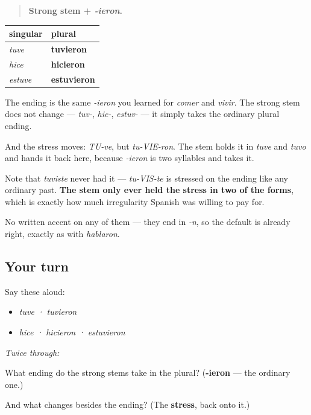 \begin{grammarlens}[title={Grammar Lens: the stem gives the stress back}]
\begin{quote}
\textbf{Strong stem + \emph{-ieron}.}
\end{quote}

\noindent
\begin{tabularx}{\linewidth}{@{}>{\raggedright\arraybackslash}X>{\raggedright\arraybackslash}X@{}}
\toprule
\textbf{singular} & \textbf{plural} \\
\midrule
\emph{tuve} & \textbf{tuvieron} \\
\emph{hice} & \textbf{hicieron} \\
\emph{estuve} & \textbf{estuvieron} \\
\bottomrule
\end{tabularx}

The ending is the same \emph{-ieron} you learned for \emph{comer} and \emph{vivir}. The strong stem does not change — \emph{tuv-}, \emph{hic-}, \emph{estuv-} — it simply takes the ordinary plural ending.

And the stress moves: \emph{TU-ve}, but \emph{tu-VIE-ron}. The stem holds it in \emph{tuve} and \emph{tuvo} and hands it back here, because \emph{-ieron} is two syllables and takes it.

Note that \emph{tuviste} never had it — \emph{tu-VIS-te} is stressed on the ending like any ordinary past. \textbf{The stem only ever held the stress in two of the forms}, which is exactly how much irregularity Spanish was willing to pay for.

No written accent on any of them — they end in \emph{-n}, so the default is already right, exactly as with \emph{hablaron}.
\end{grammarlens}

\subsection*{Your turn}
Say these aloud:

\begin{itemize}
\raggedright
  \item \emph{tuve · tuvieron}
  \item \emph{hice · hicieron · estuvieron}
\end{itemize}

\emph{Twice through:}

\begin{tcolorbox}[breakable,colback=teal!4,colframe=teal!35!black,title={Before you move on}]
What ending do the strong stems take in the plural? (\textbf{-ieron} — the ordinary one.)

And what changes besides the ending? (The \textbf{stress}, back onto it.)
\end{tcolorbox}
